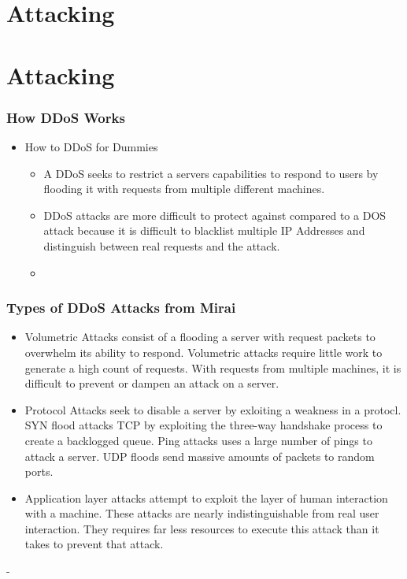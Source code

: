 \documentclass{beamer}
\begin{document}
\section{Attacking}

\section{Attacking}
\begin{frame}
    \frametitle{How DDoS Works}
    \begin{itemize}
        \item How to DDoS for Dummies
            \begin{itemize}
                \item A DDoS seeks to restrict a servers capabilities to respond to users by flooding it with requests from multiple different machines.
                \item DDoS attacks are more difficult to protect against compared to a DOS attack because it is difficult to blacklist multiple IP Addresses and distinguish between real requests and the attack.
                \item 
            \end{itemize}
    \end{itemize}
\end{frame}
\begin{frame}
    \frametitle{Types of DDoS Attacks from Mirai}
    \begin{itemize}
        \item Volumetric Attacks consist of a flooding a server with request packets to overwhelm its ability to respond. Volumetric attacks require little work to generate a high count of requests. With requests from multiple machines, it is difficult to prevent or dampen an attack on a server.
        \item Protocol Attacks seek to disable a server by exloiting a weakness in a protocl. SYN flood attacks TCP by exploiting the three-way handshake process to create a backlogged queue. Ping attacks uses a large number of pings to attack a server. UDP floods send massive amounts of packets to random ports.
        \item Application layer attacks attempt to exploit the layer of human interaction with a machine. These attacks are nearly indistinguishable from real user interaction. They requires far less resources to execute this attack than it takes to prevent that attack. 
    \end{itemize}-
    
\end{frame}
\end{document}
